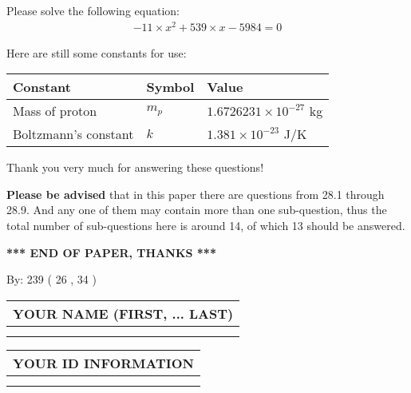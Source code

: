 \documentclass[12pt]{article}
\begin{document}
  
 
 

 
Please solve the following equation:
\begin{eqnarray*}
-11 \times x^2  %
+  %
539
                 \times x    %
-5984 =0
\end{eqnarray*}
 

 

 
\vspace{0.3in}
   
   
 \vspace{0.2in}
Here are still some constants for use:
 
 
\noindent\begin{tabular}{|l|l|l|}
\hline
Constant & Symbol & Value \\
\hline
 
Mass of proton &
$m_p$ &
 $ 1.6726231 \times 10^{-27} $
kg \\
\hline
 
Boltzmann's constant &
$k$ &
 $ 1.381 \times 10^{-23} $
J/K \\
\hline
 
\end{tabular}
 
Thank you very much for answering these questions!
 
{\textbf{\large{Please be advised}}} that in this paper there are questions from
28.1 through
28.9.
And any one of them may contain more than one sub-question, thus the total number
of sub-questions here is around 14, of which
13 should be answered.
 
   
   
   
   
\vspace{1.0in} 
{\textbf{\large{ *** END OF PAPER, THANKS *** }}} 
   
   
\hspace{1.0in} By: 
         239 (          26 ,           34 )
   
   
   
   
\newpage 
\setcounter{page}{ 
    29001 } 
   
   
   
   
\noindent\begin{tabular}{|l|}
\hline
YOUR NAME (FIRST, ... LAST)  \\
\hline
 \\ 
 \\ 
\hline
\end{tabular}
\hspace{0.05in} \begin{tabular}{|l|}
\hline
 YOUR   ID   INFORMATION  \\
\hline
 \\ 
 \\ 
\hline
\end{tabular}
   
\end{document}
